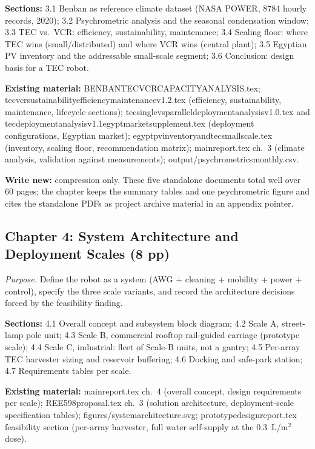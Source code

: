 \documentclass[11pt,a4paper]{article}
\newcommand{\f}[1]{{\ttfamily\def\_{\textunderscore\allowbreak}#1}}
\begin{document}
\textbf{Sections:} 3.1 Benban as reference climate dataset (NASA POWER, 8784
hourly records, 2020); 3.2 Psychrometric analysis and the seasonal condensation
window; 3.3 TEC vs.\ VCR: efficiency, sustainability, maintenance; 3.4 Scaling
floor: where TEC wins (small/distributed) and where VCR wins (central plant);
3.5 Egyptian PV inventory and the addressable small-scale segment; 3.6
Conclusion: design basis for a TEC robot.

\textbf{Existing material:} \f{BENBAN\_TEC\_VCR\_CAPACITY\_ANALYSIS.tex};
\f{tec\_vcr\_sustainability\_efficiency\_maintenance\_v1.2.tex} (efficiency,
sustainability, maintenance, lifecycle sections);
\f{tec\_single\_vs\_parallel\_deployment\_analysis\_v1.0.tex} and
\f{tec\_deployment\_analysis\_v1.1\_egypt\_market\_supplement.tex} (deployment
configurations, Egyptian market);
\f{egypt\_pv\_inventory\_and\_tec\_small\_scale.tex} (inventory, scaling floor,
recommendation matrix); \f{main\_report.tex} ch.~3 (climate analysis,
validation against measurements); \f{output/psychrometrics\_monthly.csv}.

\textbf{Write new:} compression only. These five standalone documents total
well over 60 pages; the chapter keeps the summary tables and one psychrometric
figure and cites the standalone PDFs as project archive material in an
appendix pointer.

\subsection{Chapter 4: System Architecture and Deployment Scales (8 pp)}
\textit{Purpose.} Define the robot as a system (AWG + cleaning + mobility +
power + control), specify the three scale variants, and record the architecture
decisions forced by the feasibility finding.

\textbf{Sections:} 4.1 Overall concept and subsystem block diagram; 4.2 Scale A,
street-lamp pole unit; 4.3 Scale B, commercial rooftop rail-guided carriage
(prototype scale); 4.4 Scale C, industrial: fleet of Scale-B units, not a gantry;
4.5 Per-array TEC harvester sizing and reservoir buffering; 4.6 Docking and
safe-park station; 4.7 Requirements tables per scale.

\textbf{Existing material:} \f{main\_report.tex} ch.~4 (overall concept, design
requirements per scale); \f{REE598\_proposal.tex} ch.~3 (solution architecture,
deployment-scale specification tables); \f{figures/system\_architecture.svg};
\f{prototype\_design\_report.tex} feasibility section (per-array harvester,
full water self-supply at the 0.3~L/m$^2$ dose).
\end{document}
